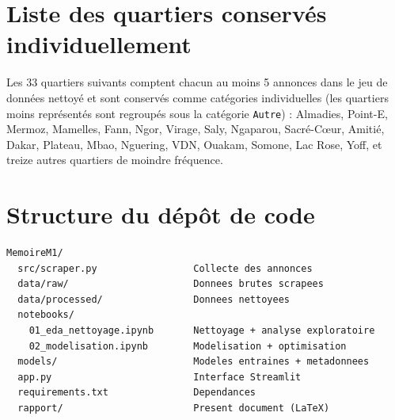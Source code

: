 \section{Liste des quartiers conservés individuellement}

Les 33 quartiers suivants comptent chacun au moins 5 annonces dans le jeu de données nettoyé et
sont conservés comme catégories individuelles (les quartiers moins représentés sont regroupés
sous la catégorie \texttt{Autre}) : Almadies, Point-E, Mermoz, Mamelles, Fann, Ngor, Virage,
Saly, Ngaparou, Sacré-Cœur, Amitié, Dakar, Plateau, Mbao, Nguering, VDN, Ouakam, Somone, Lac
Rose, Yoff, et treize autres quartiers de moindre fréquence.

\section{Structure du dépôt de code}

\begin{lstlisting}
MemoireM1/
  src/scraper.py                 Collecte des annonces
  data/raw/                      Donnees brutes scrapees
  data/processed/                Donnees nettoyees
  notebooks/
    01_eda_nettoyage.ipynb       Nettoyage + analyse exploratoire
    02_modelisation.ipynb        Modelisation + optimisation
  models/                        Modeles entraines + metadonnees
  app.py                         Interface Streamlit
  requirements.txt               Dependances
  rapport/                       Present document (LaTeX)
\end{lstlisting}
